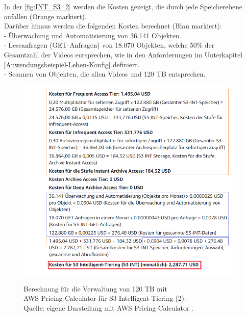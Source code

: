 \newpage
In der \autoref{fig:INT_S3_2} werden die Kosten gezeigt, die durch jede Speicherebene anfallen (Orange markiert). 
\\
Darüber hinaus werden die folgenden Kosten berechnet (Blau markiert): \\
- Überwachung und Automatisierung von 36.141 Objekten.\\
- Leseanfragen (GET-Anfragen) von 18.070 Objekten, welche 50\% der Gesamtzahl der Videos entsprechen, wie in den Anforderungen im Unterkapitel \ref{Anwendungsbeispiel-Leben-Konfig} definiert. \\
- Scannen von Objekten, die allen Videos und 120 TB entsprechen.
\\
\begin{figure}[h!]
  \centering
  \includegraphics[scale=0.6]{sources/S3_INT_2}
  \caption[Berechnung für die Verwaltung von 120 TB mit AWS Pricing-Calculator für S3 Intelligent-Tiering (2)]{}
  \label{fig:INT_S3_2} Berechnung für die Verwaltung von 120 TB mit\\ AWS Pricing-Calculator für S3 Intelligent-Tiering (2).\\
  Quelle: eigene Darstellung mit AWS Pricing-Calculator \cite{AMZ17-S3}.
\end{figure}
\\\\
